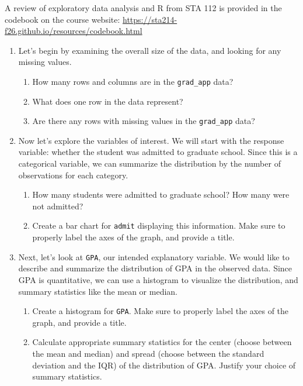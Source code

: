 \documentclass[11pt]{article}
\begin{document}
\noindent A review of exploratory data analysis and R from STA 112 is provided in the codebook on the course website: \url{https://sta214-f26.github.io/resources/codebook.html} 

\begin{enumerate}
\item Let's begin by examining the overall size of the data, and looking for any missing values.

\begin{enumerate}
\item How many rows and columns are in the \verb;grad_app; data?

\item What does one row in the data represent?

\item Are there any rows with missing values in the \verb;grad_app; data? 
\end{enumerate}

\item Now let's explore the variables of interest. We will start with the response variable: whether the student was admitted to graduate school. Since this is a categorical variable, we can summarize the distribution by the number of observations for each category.

\begin{enumerate}
\item How many students were admitted to graduate school? How many were not admitted?

\item Create a bar chart for \verb;admit; displaying this information. Make sure to properly label the axes of the graph, and provide a title.
\end{enumerate}

\item Next, let's look at \verb;GPA;, our intended explanatory variable. We would like to describe and summarize the distribution of GPA in the observed data. Since GPA is quantitative, we can use a histogram to visualize the distribution, and summary statistics like the mean or median.

\begin{enumerate}
\item Create a histogram for \verb;GPA;. Make sure to properly label the axes of the graph, and provide a title.

\item Calculate appropriate summary statistics for the center (choose between the mean and median) and spread (choose between the standard deviation and the IQR) of the distribution of GPA. Justify your choice of summary statistics.


\end{enumerate}
\end{enumerate}
\end{document}
